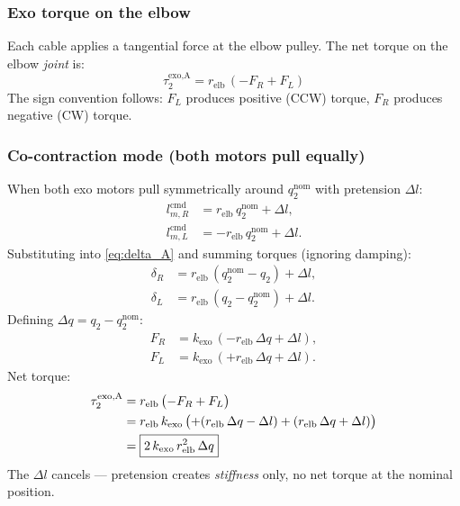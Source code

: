 \documentclass[11pt, a4paper]{article}
\begin{document}
\subsubsection{Exo torque on the elbow}

Each cable applies a tangential force at the elbow pulley.  The net torque on
the elbow \emph{joint} is:
%
\begin{equation}\label{eq:tau_A}
    \boxed{\tau_2^{\text{exo,A}} = r_{\text{elb}}\,(-F_R + F_L)}
\end{equation}
%
The sign convention follows: $F_L$ produces positive (CCW) torque, $F_R$
produces negative (CW) torque.

\subsubsection{Co-contraction mode (both motors pull equally)}

When both exo motors pull symmetrically around $q_2^{\text{nom}}$ with
pretension $\Delta l$:
%
\begin{align}
    l_{m,R}^{\text{cmd}} &= r_{\text{elb}}\,q_2^{\text{nom}} + \Delta l, \\
    l_{m,L}^{\text{cmd}} &= -r_{\text{elb}}\,q_2^{\text{nom}} + \Delta l.
\end{align}
%
Substituting into \eqref{eq:delta_A} and summing torques (ignoring damping):
%
\begin{align}
    \delta_R &= r_{\text{elb}}\,(q_2^{\text{nom}} - q_2) + \Delta l, \\
    \delta_L &= r_{\text{elb}}\,(q_2 - q_2^{\text{nom}}) + \Delta l.
\end{align}
%
Defining $\Delta q = q_2 - q_2^{\text{nom}}$:
%
\begin{align}
    F_R &= k_{\text{exo}}\,(-r_{\text{elb}}\,\Delta q + \Delta l), \\
    F_L &= k_{\text{exo}}\,(+r_{\text{elb}}\,\Delta q + \Delta l).
\end{align}
%
Net torque:
%
\begin{align}
    \tau_2^{\text{exo,A}}
    &= r_{\text{elb}}\,\bigl(-F_R + F_L\bigr) \notag \\
    &= r_{\text{elb}}\,k_{\text{exo}}\,\bigl(
        +(r_{\text{elb}}\,\Delta q - \Delta l)
        +(r_{\text{elb}}\,\Delta q + \Delta l)
       \bigr) \notag \\
    &= \boxed{2\,k_{\text{exo}}\,r_{\text{elb}}^2\,\Delta q}
    \label{eq:tau_cocontract_A}
\end{align}
%
The $\Delta l$ cancels --- pretension creates \emph{stiffness} only, no net
torque at the nominal position.
\end{document}
